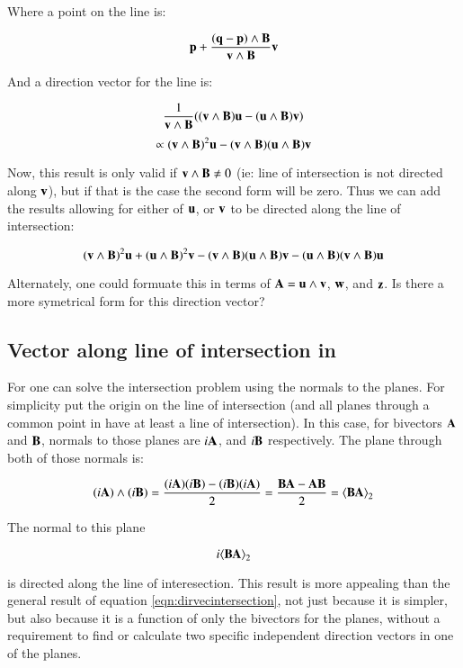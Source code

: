 \documentclass{article}      %
\newcommand{\gpgrade}[2] {{\left\langle{{#1}}\right\rangle}_{#2}}
\newcommand{\gpgradetwo}[1] {\gpgrade{#1}{2}}
\begin{document}
Where a point on the line is:

\[
\mathbf{p} + \frac{(\mathbf{q}-\mathbf{p})\wedge \mathbf{B}}{\mathbf{v} \wedge \mathbf{B}}\mathbf{v} 
\]

And a direction vector for the line is:

\[
\frac{1}{\mathbf{v} \wedge \mathbf{B}}((\mathbf{v} \wedge \mathbf{B}) \mathbf{u} - (\mathbf{u} \wedge \mathbf{B})\mathbf{v})
\]
\[
\propto
(\mathbf{v} \wedge \mathbf{B})^2 \mathbf{u} - (\mathbf{v} \wedge \mathbf{B})(\mathbf{u} \wedge \mathbf{B})\mathbf{v}
\]

Now, this result is only valid if $\mathbf{v} \wedge \mathbf{B} \ne 0$ (ie: line of intersection is not directed along $\mathbf{v}$), but if that is the case the second form will be zero.  Thus we can add the results allowing for either of $\mathbf{u}$, or $\mathbf{v}$ to be directed along the line of intersection:

\begin{equation}\label{eqn:dirvecintersection}
(\mathbf{v} \wedge \mathbf{B})^2 \mathbf{u}
+ (\mathbf{u} \wedge \mathbf{B})^2 \mathbf{v} 
- (\mathbf{v} \wedge \mathbf{B})(\mathbf{u} \wedge \mathbf{B})\mathbf{v}
- (\mathbf{u} \wedge \mathbf{B})(\mathbf{v} \wedge \mathbf{B})\mathbf{u}
\end{equation}

Alternately, one could formuate this in terms of $\mathbf{A} = \mathbf{u} \wedge \mathbf{v}$, $\mathbf{w}$, and $\mathbf{z}$.  Is there a more symetrical form for this direction vector?

\subsection{ Vector along line of intersection in }

For  one can solve the intersection problem using the normals to the planes.  For simplicity put the origin on the line of intersection (and all planes through a common point in  have at least a line of intersection).  In this case, for bivectors $\mathbf{A}$ and $\mathbf{B}$, normals to those planes are $i\mathbf{A}$, and $i\mathbf{B}$ respectively.  The plane through both of those normals is:

\begin{align*}
(i\BA) \wedge (i\BB)
= \frac{(i\BA)(i\BB) - (i\BB)(i\BA)}{2} 
= \frac{\BB\BA - \BA\BB}{2} 
= \gpgradetwo{\BB\BA}
\end{align*}

The normal to this plane

\begin{equation}\label{eqn:r3planeintersect}
i\gpgradetwo{\BB\BA}
\end{equation}

is directed along the line of interesection.  This result is more appealing than
the general  result of equation \ref{eqn:dirvecintersection}, not
just because it is simpler, but also because it is a function of only the
bivectors for the planes, without a requirement to find or calculate
two specific independent direction vectors in one of the planes.
\end{document}
